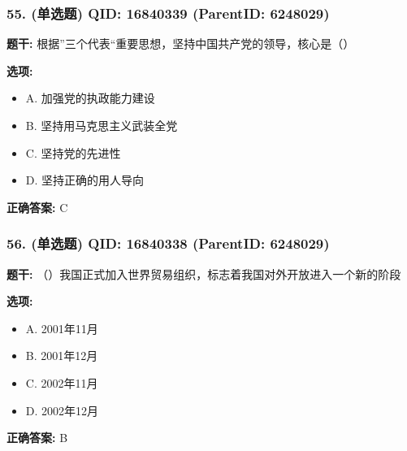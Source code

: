 \documentclass[12pt,UTF8]{ctexart}
\begin{document}
\subsubsection*{55. (单选题) \small QID: 16840339 (ParentID: 6248029)}

\textbf{题干:}
根据”三个代表“重要思想，坚持中国共产党的领导，核心是（）



\textbf{选项:}
\begin{itemize}[leftmargin=*]

  \item A. 加强党的执政能力建设

  \item B. 坚持用马克思主义武装全党

  \item C. 坚持党的先进性

  \item D. 坚持正确的用人导向

\end{itemize}

\textbf{正确答案:}
C

\vspace{0.3em}\hrulefill\vspace{0.7em}

\subsubsection*{56. (单选题) \small QID: 16840338 (ParentID: 6248029)}

\textbf{题干:}
（）我国正式加入世界贸易组织，标志着我国对外开放进入一个新的阶段



\textbf{选项:}
\begin{itemize}[leftmargin=*]

  \item A. 2001年11月

  \item B. 2001年12月

  \item C. 2002年11月

  \item D. 2002年12月

\end{itemize}

\textbf{正确答案:}
B

\vspace{0.3em}\hrulefill\vspace{0.7em}
\end{document}
